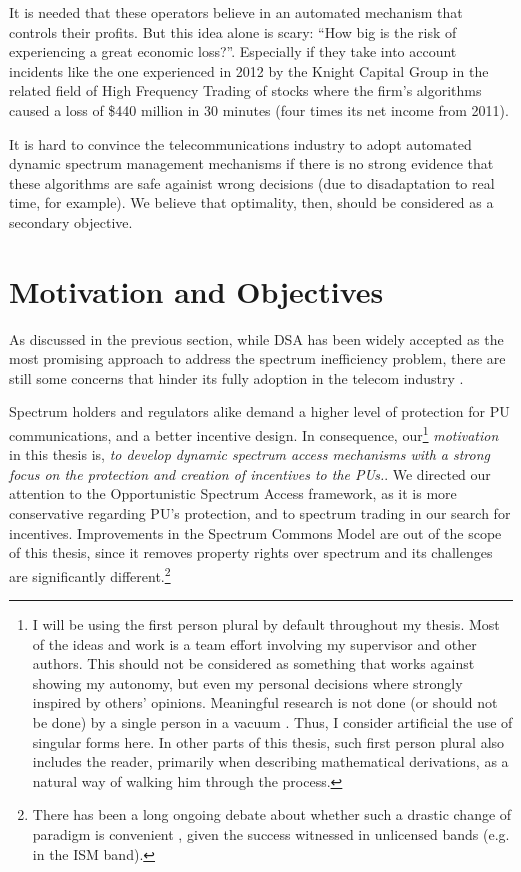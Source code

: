 It is needed that these operators believe in an automated mechanism that controls their profits. But this idea alone is scary: \enquote{How big is the risk of experiencing a great economic loss?}. Especially if they take into account incidents like the one experienced in 2012 by the Knight Capital Group in the related
field of High Frequency Trading of stocks \cite{web:Silver2012} where the firm's algorithms caused a loss of \$440 million in 30 minutes (four times its net income from 2011).

It is hard to convince the telecommunications industry to adopt automated dynamic spectrum management mechanisms if there is no strong evidence that these algorithms are safe againist wrong decisions (due to disadaptation to real time, for example). We believe that optimality, then, should be considered as a secondary objective.

\section{Motivation and Objectives}

As discussed in the previous section, while DSA has been widely accepted as the most promising approach to address the spectrum inefficiency problem, there are still some concerns that hinder its fully adoption in the telecom industry \cite{ref:Kelly2012}.

Spectrum holders and regulators alike demand a higher level of protection for PU communications, and a better incentive design. In consequence, our\footnote{I will be using the first person plural by default throughout my thesis. Most of the ideas and work is a team effort involving my supervisor and other authors. This should not be considered as something that works against showing my autonomy, but even my personal decisions where strongly inspired by others' opinions. Meaningful research is not done (or should not be done) by a single person in a vacuum \cite{ref:Mihaly2013}. Thus, I consider artificial the use of singular forms here. In other parts of this thesis, such first person plural also includes the reader, primarily when describing mathematical derivations, as a natural way of walking him through the process.} \emph{motivation} in this thesis is, \emph{to develop dynamic spectrum access mechanisms with a strong focus on the protection and creation of incentives to the PUs.}. We directed our attention to the Opportunistic Spectrum Access framework, as it is more conservative regarding PU's protection, and to spectrum trading in our search for incentives.
Improvements in the Spectrum Commons Model are out of the scope of this thesis, since it removes property rights over spectrum and its challenges are significantly different.\footnote{There has been a long ongoing debate about whether such a drastic change of paradigm is convenient \cite{ref:Peha2005}, given the success witnessed in unlicensed bands (e.g. in the ISM band).}

